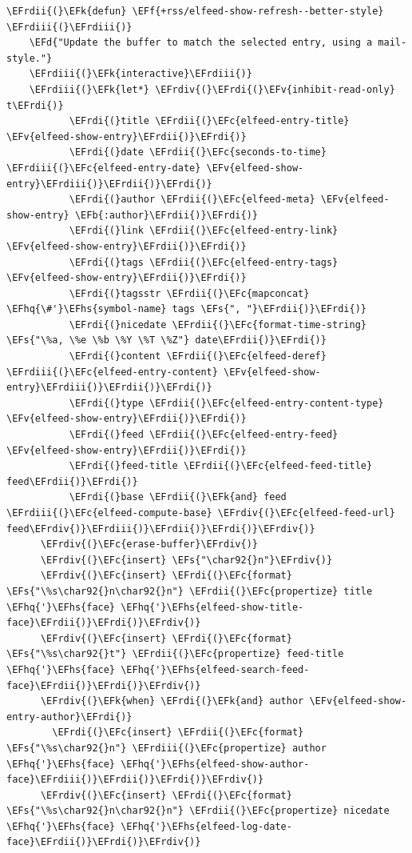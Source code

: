 \documentclass{scrartcl}
\newcommand{\EFk}[1]{\textcolor{EFk}{#1}} %
\newcommand{\EFd}[1]{\textcolor{EFd}{\textit{#1}}} %
\newcommand{\EFs}[1]{\textcolor{EFs}{#1}} %
\newcommand{\EFb}[1]{\textcolor{EFb}{#1}} %
\newcommand{\EFc}[1]{\textcolor{EFc}{#1}} %
\newcommand{\EFv}[1]{\textcolor{EFv}{#1}} %
\newcommand{\EFf}[1]{\textcolor{EFf}{#1}} %
\newcommand{\EFhq}[1]{\textcolor{EFhq}{#1}} %
\newcommand{\EFhs}[1]{\textcolor{EFhs}{#1}} %
\newcommand{\EFrdi}[1]{\textcolor{EFrdi}{#1}} %
\newcommand{\EFrdii}[1]{\textcolor{EFrdii}{#1}} %
\newcommand{\EFrdiii}[1]{\textcolor{EFrdiii}{#1}} %
\newcommand{\EFrdiv}[1]{\textcolor{EFrdiv}{#1}} %
\begin{document}
\begin{Code}
\begin{Verbatim}[]
  \EFrdii{(}\EFk{defun} \EFf{+rss/elfeed-show-refresh--better-style} \EFrdiii{(}\EFrdiii{)}
    \EFd{"Update the buffer to match the selected entry, using a mail-style."}
    \EFrdiii{(}\EFk{interactive}\EFrdiii{)}
    \EFrdiii{(}\EFk{let*} \EFrdiv{(}\EFrdi{(}\EFv{inhibit-read-only} t\EFrdi{)}
           \EFrdi{(}title \EFrdii{(}\EFc{elfeed-entry-title} \EFv{elfeed-show-entry}\EFrdii{)}\EFrdi{)}
           \EFrdi{(}date \EFrdii{(}\EFc{seconds-to-time} \EFrdiii{(}\EFc{elfeed-entry-date} \EFv{elfeed-show-entry}\EFrdiii{)}\EFrdii{)}\EFrdi{)}
           \EFrdi{(}author \EFrdii{(}\EFc{elfeed-meta} \EFv{elfeed-show-entry} \EFb{:author}\EFrdii{)}\EFrdi{)}
           \EFrdi{(}link \EFrdii{(}\EFc{elfeed-entry-link} \EFv{elfeed-show-entry}\EFrdii{)}\EFrdi{)}
           \EFrdi{(}tags \EFrdii{(}\EFc{elfeed-entry-tags} \EFv{elfeed-show-entry}\EFrdii{)}\EFrdi{)}
           \EFrdi{(}tagsstr \EFrdii{(}\EFc{mapconcat} \EFhq{\#'}\EFhs{symbol-name} tags \EFs{", "}\EFrdii{)}\EFrdi{)}
           \EFrdi{(}nicedate \EFrdii{(}\EFc{format-time-string} \EFs{"\%a, \%e \%b \%Y \%T \%Z"} date\EFrdii{)}\EFrdi{)}
           \EFrdi{(}content \EFrdii{(}\EFc{elfeed-deref} \EFrdiii{(}\EFc{elfeed-entry-content} \EFv{elfeed-show-entry}\EFrdiii{)}\EFrdii{)}\EFrdi{)}
           \EFrdi{(}type \EFrdii{(}\EFc{elfeed-entry-content-type} \EFv{elfeed-show-entry}\EFrdii{)}\EFrdi{)}
           \EFrdi{(}feed \EFrdii{(}\EFc{elfeed-entry-feed} \EFv{elfeed-show-entry}\EFrdii{)}\EFrdi{)}
           \EFrdi{(}feed-title \EFrdii{(}\EFc{elfeed-feed-title} feed\EFrdii{)}\EFrdi{)}
           \EFrdi{(}base \EFrdii{(}\EFk{and} feed \EFrdiii{(}\EFc{elfeed-compute-base} \EFrdiv{(}\EFc{elfeed-feed-url} feed\EFrdiv{)}\EFrdiii{)}\EFrdii{)}\EFrdi{)}\EFrdiv{)}
      \EFrdiv{(}\EFc{erase-buffer}\EFrdiv{)}
      \EFrdiv{(}\EFc{insert} \EFs{"\char92{}n"}\EFrdiv{)}
      \EFrdiv{(}\EFc{insert} \EFrdi{(}\EFc{format} \EFs{"\%s\char92{}n\char92{}n"} \EFrdii{(}\EFc{propertize} title \EFhq{'}\EFhs{face} \EFhq{'}\EFhs{elfeed-show-title-face}\EFrdii{)}\EFrdi{)}\EFrdiv{)}
      \EFrdiv{(}\EFc{insert} \EFrdi{(}\EFc{format} \EFs{"\%s\char92{}t"} \EFrdii{(}\EFc{propertize} feed-title \EFhq{'}\EFhs{face} \EFhq{'}\EFhs{elfeed-search-feed-face}\EFrdii{)}\EFrdi{)}\EFrdiv{)}
      \EFrdiv{(}\EFk{when} \EFrdi{(}\EFk{and} author \EFv{elfeed-show-entry-author}\EFrdi{)}
        \EFrdi{(}\EFc{insert} \EFrdii{(}\EFc{format} \EFs{"\%s\char92{}n"} \EFrdiii{(}\EFc{propertize} author \EFhq{'}\EFhs{face} \EFhq{'}\EFhs{elfeed-show-author-face}\EFrdiii{)}\EFrdii{)}\EFrdi{)}\EFrdiv{)}
      \EFrdiv{(}\EFc{insert} \EFrdi{(}\EFc{format} \EFs{"\%s\char92{}n\char92{}n"} \EFrdii{(}\EFc{propertize} nicedate \EFhq{'}\EFhs{face} \EFhq{'}\EFhs{elfeed-log-date-face}\EFrdii{)}\EFrdi{)}\EFrdiv{)}

\end{Verbatim}
\end{Code}
\end{document}
